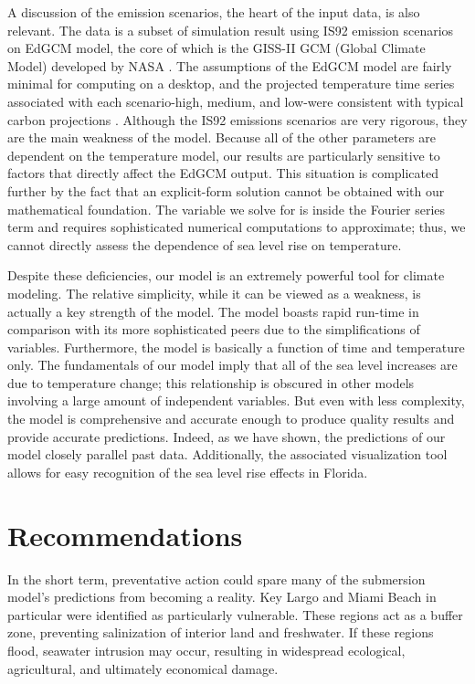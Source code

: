 \documentclass[12pt,a4paper,titlepage]{article}
\begin{document}
A discussion of the emission scenarios, the heart of the input
data, is also relevant. The data is a subset of simulation result
using IS92 emission scenarios on EdGCM model, the core of which is
the GISS-II GCM (Global Climate Model) developed by NASA . The
assumptions of the EdGCM model are fairly minimal for computing on
a desktop, and the projected temperature time series associated
with each scenario-high, medium, and low-were consistent with
typical carbon projections . Although the IS92 emissions scenarios
are very rigorous, they are the main weakness of the model.
Because all of the other parameters are dependent on the
temperature model, our results are particularly sensitive to
factors that directly affect the EdGCM output. This situation is
complicated further by the fact that an explicit-form solution
cannot be obtained with our mathematical foundation. The variable
we solve for is inside the Fourier series term and requires
sophisticated numerical computations to approximate; thus, we
cannot directly assess the dependence of sea level rise on
temperature.

Despite these deficiencies, our model is an extremely powerful
tool for climate modeling. The relative simplicity, while it can
be viewed as a weakness, is actually a key strength of the model.
The model boasts rapid run-time in comparison with its more
sophisticated peers due to the simplifications of variables.
Furthermore, the model is basically a function of time and
temperature only. The fundamentals of our model imply that all of
the sea level increases are due to temperature change; this
relationship is obscured in other models involving a large amount
of independent variables. But even with less complexity, the model
is comprehensive and accurate enough to produce quality results
and provide accurate predictions. Indeed, as we have shown, the
predictions of our model closely parallel past data. Additionally,
the associated visualization tool allows for easy recognition of
the sea level rise effects in Florida.

\section{Recommendations}

In the short term, preventative action could spare many of the
submersion model's predictions from becoming a reality. Key Largo
and Miami Beach in particular were identified as particularly
vulnerable. These regions act as a buffer zone, preventing
salinization of interior land and freshwater. If these regions
flood, seawater intrusion may occur, resulting in widespread
ecological, agricultural, and ultimately economical damage.
\end{document}
